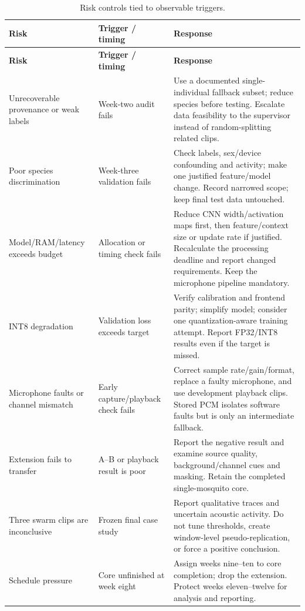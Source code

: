 \documentclass[a4paper,11pt]{article}
\begin{document}
\begin{small}
\begin{longtable}{P{3.5cm}P{3.0cm}P{9.4cm}}
\caption{Risk controls tied to observable triggers.}\label{tab:risks}\\
\toprule\textbf{Risk} & \textbf{Trigger / timing} & \textbf{Response}\\\midrule
\endfirsthead
\toprule\textbf{Risk} & \textbf{Trigger / timing} & \textbf{Response}\\\midrule
\endhead
Unrecoverable provenance or weak labels & Week-two audit fails & Use a documented single-individual fallback subset; reduce species before testing. Escalate data feasibility to the supervisor instead of random-splitting related clips.\\
Poor species discrimination & Week-three validation fails & Check labels, sex/device confounding and activity; make one justified feature/model change. Record narrowed scope; keep final test data untouched.\\
Model/RAM/latency exceeds budget & Allocation or timing check fails & Reduce CNN width/activation maps first, then feature/context size or update rate if justified. Recalculate the processing deadline and report changed requirements. Keep the microphone pipeline mandatory.\\
INT8 degradation & Validation loss exceeds target & Verify calibration and frontend parity; simplify model; consider one quantization-aware training attempt. Report FP32/INT8 results even if the target is missed.\\
Microphone faults or channel mismatch & Early capture/playback check fails & Correct sample rate/gain/format, replace a faulty microphone, and use development playback clips. Stored PCM isolates software faults but is only an intermediate fallback.\\
Extension fails to transfer & A--B or playback result is poor & Report the negative result and examine source quality, background/channel cues and masking. Retain the completed single-mosquito core.\\
Three swarm clips are inconclusive & Frozen final case study & Report qualitative traces and uncertain acoustic activity. Do not tune thresholds, create window-level pseudo-replication, or force a positive conclusion.\\
Schedule pressure & Core unfinished at week eight & Assign weeks nine--ten to core completion; drop the extension. Protect weeks eleven--twelve for analysis and reporting.\\
\bottomrule
\end{longtable}
\end{small}
\end{document}

